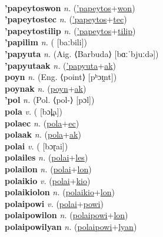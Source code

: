  \label{'papeytosak} \\
\textbf{'papeytoswon} \textit{n.} (\hyperref['papeytos]{'papeytos}+\hyperref[won]{won})
 \label{'papeytoswon} \\
\textbf{'papeytostec} \textit{n.} (\hyperref['papeytos]{'papeytos}+\hyperref[tec]{tec})
 \label{'papeytostec} \\
\textbf{'papeytostilip} \textit{n.} (\hyperref['papeytos]{'papeytos}+\hyperref[tilip]{tilip})
 \label{'papeytostilip} \\
\textbf{'papilim} \textit{n.} ( [baːbili])
 \label{'papilim} \\
\textbf{'papyuta} \textit{n.} (Aig. ⟨Barbuda⟩ [bɑːˈbjuːdə])
 \label{'papyuta} \\
\textbf{'papyutaak} \textit{n.} (\hyperref['papyuta]{'papyuta}+\hyperref[ak]{ak})
 \label{'papyutaak} \\
\textbf{poyn} \textit{n.} (Eng. ⟨point⟩ [pʰɔɪ̯nt])
 \label{poyn} \\
\textbf{poynak} \textit{n.} (\hyperref[poyn]{poyn}+\hyperref[ak]{ak})
 \label{poynak} \\
\textbf{'pol} \textit{n.} (Pol. ⟨pol-⟩ [pɔl])
 \label{'pol} \\
\textbf{pola} \textit{v.} ( [bɔl̪a])
 \label{pola} \\
\textbf{polaec} \textit{n.} (\hyperref[pola]{pola}+\hyperref[ec]{ec})
 \label{polaec} \\
\textbf{polaak} \textit{n.} (\hyperref[pola]{pola}+\hyperref[ak]{ak})
 \label{polaak} \\
\textbf{polai} \textit{v.} ( [bɔɽai])
 \label{polai} \\
\textbf{polailes} \textit{n.} (\hyperref[polai]{polai}+\hyperref[les]{les})
 \label{polailes} \\
\textbf{polailon} \textit{n.} (\hyperref[polai]{polai}+\hyperref[lon]{lon})
 \label{polailon} \\
\textbf{polaikio} \textit{v.} (\hyperref[polai]{polai}+\hyperref[kio]{kio})
 \label{polaikio} \\
\textbf{polaikiolon} \textit{n.} (\hyperref[polaikio]{polaikio}+\hyperref[lon]{lon})
 \label{polaikiolon} \\
\textbf{polaipowi} \textit{v.} (\hyperref[polai]{polai}+\hyperref[powi]{powi})
 \label{polaipowi} \\
\textbf{polaipowilon} \textit{n.} (\hyperref[polaipowi]{polaipowi}+\hyperref[lon]{lon})
 \label{polaipowilon} \\
\textbf{polaipowilyan} \textit{n.} (\hyperref[polaipowi]{polaipowi}+\hyperref[lyan]{lyan})
